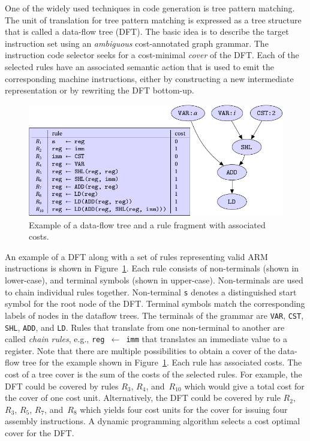 One of the widely used techniques in code generation is tree pattern
matching. The unit of translation for tree pattern matching is 
expressed as a tree structure
that is called a data-flow tree (DFT). 
The basic idea is
to describe the target instruction set using an \emph{ambiguous}
cost-annotated graph grammar. The instruction code selector seeks for a
cost-minimal \emph{cover} of the DFT. Each of the selected rules have
an associated semantic action that is used to emit the corresponding
machine instructions, either by constructing a new intermediate
representation or by rewriting the DFT bottom-up.
\begin{figure}[ht]
  \begin{center}
    \includegraphics[scale=0.9]{pgf-fig002}
  \end{center}
  \caption{Example of a data-flow tree and a rule fragment with
    associated costs.}\label{fig:tpm}
\end{figure}

An example of a DFT along with a set of rules representing valid ARM
instructions is shown in Figure~\ref{fig:tpm}. Each rule consists of
non-terminals (shown in lower-case), and terminal symbols (shown in
upper-case). Non-terminals are used to chain individual rules together.
Non-terminal \texttt{s} denotes a distinguished start symbol for the
root node of the DFT. Terminal symbols match the corresponding labels
of nodes in the dataflow trees. The terminals of the grammar are
\texttt{VAR}, \texttt{CST}, \texttt{SHL}, \texttt{ADD}, and
\texttt{LD}.  Rules that translate from one non-terminal to another are
called \emph{chain rules}, e.g., \texttt{reg $\gets$ imm} that translates
an immediate value to a register. Note that there are multiple
possibilities to obtain a cover of the data-flow tree for the example
shown in Figure~\ref{fig:tpm}.  Each rule has associated costs. The
cost of a tree cover is the sum of the costs of the selected
rules. For example, the DFT could be covered by rules $R_3$, $R_4$, and~$R_{10}$ which would give a total cost for the cover of one cost
unit. Alternatively, the DFT could be covered by rule $R_2$, $R_3$, $R_5$, $R_7$, and~$R_8$ which yields four cost units for the cover for issuing four assembly
instructions. A dynamic programming algorithm selects a cost optimal
cover for the DFT.


